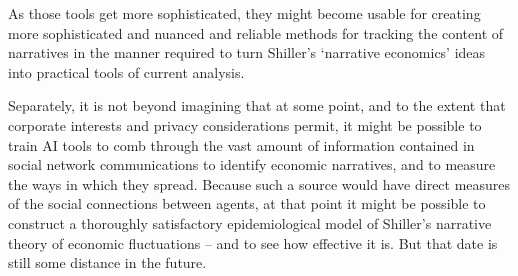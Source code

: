 As those tools get more sophisticated, they might become usable for creating more sophisticated and nuanced and reliable methods for tracking the content of narratives in the manner required to turn Shiller's `narrative economics' ideas into practical tools of current analysis.

Separately, it is not beyond imagining that at some point, and to the extent that corporate interests and privacy considerations permit, it might be possible to train AI tools to comb through the vast amount of information contained in social network communications to identify economic narratives, and to measure the ways in which they spread.  Because such a source would have direct measures of the social connections between agents, at that point it might be possible to construct a thoroughly satisfactory epidemiological model of Shiller's narrative theory of economic fluctuations -- and to see how effective it is.  But that date is still some distance in the future.


